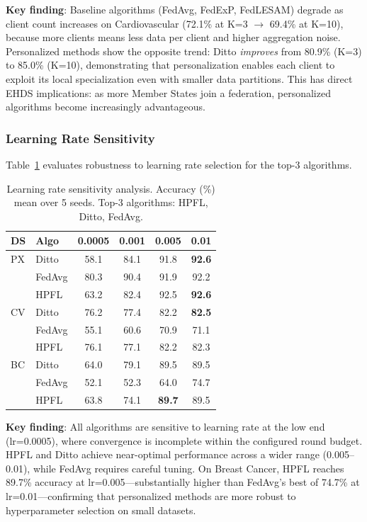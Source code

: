 \documentclass[conference]{IEEEtran}
\begin{document}
\textbf{Key finding}: Baseline algorithms (FedAvg, FedExP, FedLESAM) degrade as client count increases on Cardiovascular (72.1\% at K=3 $\to$ 69.4\% at K=10), because more clients means less data per client and higher aggregation noise. Personalized methods show the opposite trend: Ditto \textit{improves} from 80.9\% (K=3) to 85.0\% (K=10), demonstrating that personalization enables each client to exploit its local specialization even with smaller data partitions. This has direct EHDS implications: as more Member States join a federation, personalized algorithms become increasingly advantageous.

\subsubsection{Learning Rate Sensitivity}

Table~\ref{tab:lr_sensitivity} evaluates robustness to learning rate selection for the top-3 algorithms.

\begin{table}[t]
\centering
\caption{Learning rate sensitivity analysis. Accuracy (\%) mean over 5 seeds. Top-3 algorithms: HPFL, Ditto, FedAvg.}
\label{tab:lr_sensitivity}
\small
\begin{tabular}{llcccc}
\toprule
\textbf{DS} & \textbf{Algo} & \textbf{0.0005} & \textbf{0.001} & \textbf{0.005} & \textbf{0.01} \\
\midrule
PX & Ditto & 58.1 & 84.1 & 91.8 & \textbf{92.6} \\
 & FedAvg & 80.3 & 90.4 & 91.9 & 92.2 \\
 & HPFL & 63.2 & 82.4 & 92.5 & \textbf{92.6} \\
\midrule
CV & Ditto & 76.2 & 77.4 & 82.2 & \textbf{82.5} \\
 & FedAvg & 55.1 & 60.6 & 70.9 & 71.1 \\
 & HPFL & 76.1 & 77.1 & 82.2 & 82.3 \\
\midrule
BC & Ditto & 64.0 & 79.1 & 89.5 & 89.5 \\
 & FedAvg & 52.1 & 52.3 & 64.0 & 74.7 \\
 & HPFL & 63.8 & 74.1 & \textbf{89.7} & 89.5 \\
\bottomrule
\end{tabular}
\end{table}

\textbf{Key finding}: All algorithms are sensitive to learning rate at the low end (lr=0.0005), where convergence is incomplete within the configured round budget. HPFL and Ditto achieve near-optimal performance across a wider range (0.005--0.01), while FedAvg requires careful tuning. On Breast Cancer, HPFL reaches 89.7\% accuracy at lr=0.005---substantially higher than FedAvg's best of 74.7\% at lr=0.01---confirming that personalized methods are more robust to hyperparameter selection on small datasets.
\end{document}
